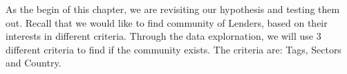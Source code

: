 As the begin of this chapter, we are revisiting our hypothesis and testing them out.
Recall that we would like to find community of Lenders, based on their interests in different criteria.
Through the data explornation, we will use 3 different criteria to find if the community exists.
The criteria are: Tags, Sectors and Country.

